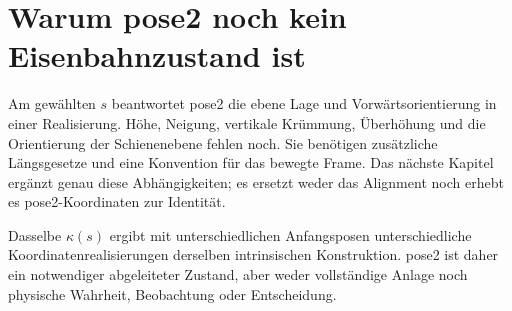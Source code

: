 \section{Warum pose2 noch kein Eisenbahnzustand ist}

Am gewählten \(s\) beantwortet pose2 die ebene Lage und Vorwärtsorientierung
in einer Realisierung. Höhe, Neigung, vertikale Krümmung, Überhöhung und die
Orientierung der Schienenebene fehlen noch. Sie benötigen zusätzliche
Längsgesetze und eine Konvention für das bewegte Frame. Das nächste Kapitel
ergänzt genau diese Abhängigkeiten; es ersetzt weder das Alignment noch erhebt
es pose2-Koordinaten zur Identität.

\begin{summary}
Dasselbe \(\kappa(s)\) ergibt mit unterschiedlichen Anfangsposen
unterschiedliche Koordinatenrealisierungen derselben intrinsischen
Konstruktion. pose2 ist daher ein notwendiger abgeleiteter Zustand, aber weder
vollständige Anlage noch physische Wahrheit, Beobachtung oder Entscheidung.
\end{summary}
